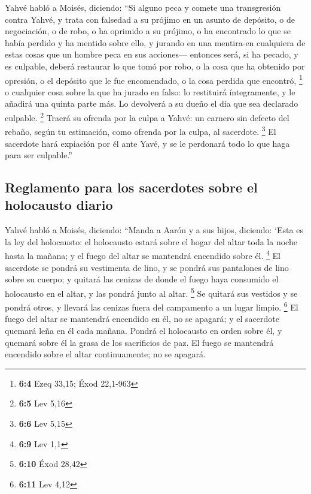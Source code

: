  Yahvé habló a Moisés, diciendo:  ``Si
alguno peca y comete una transgresión contra Yahvé, y trata con falsedad
a su prójimo en un asunto de depósito, o de negociación, o de robo, o ha
oprimido a su prójimo,  o ha encontrado lo que se había
perdido y ha mentido sobre ello, y jurando en una mentira-en cualquiera
de estas cosas que un hombre peca en sus acciones--- 
entonces será, si ha pecado, y es culpable, deberá restaurar lo que tomó
por robo, o la cosa que ha obtenido por opresión, o el depósito que le
fue encomendado, o la cosa perdida que encontró, \footnote{\textbf{6:4}
  Ezeq 33,15; Éxod 22,1-963}  o cualquier cosa sobre la
que ha jurado en falso: lo restituirá íntegramente, y le añadirá una
quinta parte más. Lo devolverá a su dueño el día que sea declarado
culpable. \footnote{\textbf{6:5} Lev 5,16}  Traerá su
ofrenda por la culpa a Yahvé: un carnero sin defecto del rebaño, según
tu estimación, como ofrenda por la culpa, al sacerdote. \footnote{\textbf{6:6}
  Lev 5,15}  El sacerdote hará expiación por él ante Yavé,
y se le perdonará todo lo que haga para ser culpable.''

\hypertarget{reglamento-para-los-sacerdotes-sobre-el-holocausto-diario}{%
\subsection{Reglamento para los sacerdotes sobre el holocausto
diario}\label{reglamento-para-los-sacerdotes-sobre-el-holocausto-diario}}

 Yahvé habló a Moisés, diciendo:  ``Manda a
Aarón y a sus hijos, diciendo: `Esta es la ley del holocausto: el
holocausto estará sobre el hogar del altar toda la noche hasta la
mañana; y el fuego del altar se mantendrá encendido sobre él.
\footnote{\textbf{6:9} Lev 1,1}  El sacerdote se pondrá
su vestimenta de lino, y se pondrá sus pantalones de lino sobre su
cuerpo; y quitará las cenizas de donde el fuego haya consumido el
holocausto en el altar, y las pondrá junto al altar. \footnote{\textbf{6:10}
  Éxod 28,42}  Se quitará sus vestidos y se pondrá otros,
y llevará las cenizas fuera del campamento a un lugar limpio.
\footnote{\textbf{6:11} Lev 4,12}  El fuego del altar se
mantendrá encendido en él, no se apagará; y el sacerdote quemará leña en
él cada mañana. Pondrá el holocausto en orden sobre él, y quemará sobre
él la grasa de los sacrificios de paz.  El fuego se
mantendrá encendido sobre el altar continuamente; no se apagará.

